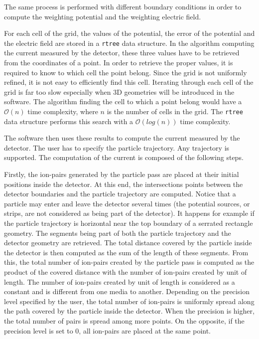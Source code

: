 \documentclass[11pt]{article}
\begin{document}
	The same process is performed with different boundary conditions in order
	to compute the weighting potential and the weighting electric field.

	For each cell of the grid, the values of the potential, the error of the
	potential and the electric field are stored in a \texttt{rtree} data structure.
	In the algorithm computing the current measured by the detector, these three
	values have to be retrieved from the coordinates of a point. In order to retrieve the proper
	values, it is required to know to which cell the point belong. Since the grid
	is not uniformly refined, it is not easy to efficiently find this cell.
	Iterating through each cell of the grid is far too slow especially when 3D
	geometries will be introduced in the software. The algorithm finding the cell
	to which a point belong would have a $\mathcal{O}(n)$ time complexity, where $n$
	is the number of cells in the grid. The \texttt{rtree} data structure
	performs this search with a $\mathcal{O}(log(n))$ time complexity.

	The software then uses these results to compute the current measured by the
	detector. The user has to specify the particle trajectory. Any trajectory is
	supported. The computation of the current is composed of the following steps.

	Firstly, the ion-pairs generated by the particle pass are placed at their initial
	positions inside the detector. At this end, the intersections points between the
	detector boundaries and the particle
	trajectory are computed. Notice that a particle may enter and leave the detector
	several times (the potential sources, or strips, are not considered as being
	part of the detector). It happens for example if the particle trajectory is
	horizontal near the top boundary of a serrated rectangle geometry.
	The segments being part of both the particle trajectory and the detector
	geometry are retrieved. The total
	distance covered by the particle inside the detector is then computed as
	the sum of the length of these segments. From this, the total number of ion-pairs
	created by the particle pass is computed
	as the product of the covered distance with the number of ion-pairs created by unit
	of length. The number of ion-pairs created by unit
	of length is considered as a constant and is different from one
	media to another. Depending on the precision level specified by the user, the
	total number of ion-pairs
	is uniformly spread along the path covered by the particle inside the
	detector. When the precision is higher, the total number of pairs is spread
	among more points. On the opposite, if the precision level is set to 0,
	all ion-pairs are placed at the same point.
\end{document}
